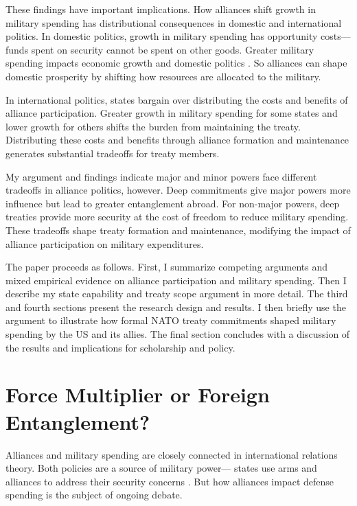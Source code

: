 \documentclass[12pt]{article}
\begin{document}
These findings have important implications. 
How alliances shift growth in military spending has distributional consequences in domestic and international politics.
In domestic politics, growth in military spending has opportunity costs--- funds spent on security cannot be spent on other goods. 
Greater military spending impacts economic growth \citep{ShinWard1999, AlptekinLevine2012} and domestic politics \citep{Narizny2003, WhittenWilliams2011, Williams2015}.
So alliances can shape domestic prosperity by shifting how resources are allocated to the military. 


In international politics, states bargain over distributing the costs and benefits of alliance participation.
Greater growth in military spending for some states and lower growth for others shifts the burden from maintaining the treaty. 
Distributing these costs and benefits through alliance formation and maintenance generates substantial tradeoffs for treaty members.  


My argument and findings indicate major and minor powers face different tradeoffs in alliance politics, however.
Deep commitments give major powers more influence but lead to greater entanglement abroad.
For non-major powers, deep treaties provide more security at the cost of freedom to reduce military spending. 
These tradeoffs shape treaty formation and maintenance, modifying the impact of alliance participation on military expenditures. 


The paper proceeds as follows. 
First, I summarize competing arguments and mixed empirical evidence on alliance participation and military spending. 
Then I describe my state capability and treaty scope argument in more detail. 
The third and fourth sections present the research design and results. 
I then briefly use the argument to illustrate how formal NATO treaty commitments shaped military spending by the US and its allies. 
The final section concludes with a discussion of the results and implications for scholarship and policy.  


\section{Force Multiplier or Foreign Entanglement?}


Alliances and military spending are closely connected in international relations theory. 
Both policies are a source of military power--- states use arms and alliances to address their security concerns \citep{Morrow1993}. 
But how alliances impact defense spending is the subject of ongoing debate. 
\end{document}
